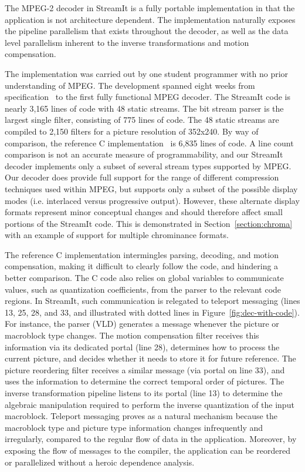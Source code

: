 The MPEG-2 decoder in StreamIt is a fully portable implementation in
that the application is not architecture dependent. The implementation
naturally exposes the pipeline parallelism that exists throughout the
decoder, as well as the data level parallelism inherent to the inverse
transformations and motion compensation.

The implementation was carried out by one student programmer with no
prior understanding of MPEG. The development spanned eight weeks from
specification~\cite{MPEG2} to the first fully functional MPEG
decoder. The StreamIt code is nearly 3,165 lines of code with 48
static streams. The bit stream parser is the largest single filter,
consisting of 775 lines of code. The 48 static streams are compiled to
2,150 filters for a picture resolution of 352x240. By way of
comparison, the reference C implementation~\cite{reference-mpeg-c} is
6,835 lines of code. A line count comparison is not an accurate
measure of programmability, and our StreamIt decoder 
implements only a subset of several stream types supported by MPEG.
Our decoder does provide full support for the range of different 
compression techniques used within MPEG, but supports only a subset 
of the possible display modes (i.e. interlaced versus progressive output).
However, these alternate display formats represent minor conceptual
changes and should therefore affect small portions of the StreamIt code. 
This is demonstrated in Section~\ref{section:chroma} with an example of
support for multiple chrominance formats. 

The reference C implementation intermingles parsing, decoding, and
motion compensation, making it difficult to clearly follow the code,
and hindering a better comparison. The C code also relies on global
variables to communicate values, such as quantization coefficients,
from the parser to the relevant code regions. In StreamIt, such
communication is relegated to teleport messaging (lines 13, 25, 28, and
33, and illustrated with dotted lines in
Figure~\ref{fig:dec-with-code}). For instance, the parser (VLD)
generates a message whenever the picture or macroblock type
changes. The motion compensation filter receives this information via
its dedicated portal (line 28), determines how to process the current
picture, and decides whether it needs to store it for future
reference. The picture reordering filter receives a similar message
(via portal on line 33), and uses the information to determine the
correct temporal order of pictures. The inverse transformation
pipeline listens to its portal (line 13) to determine the algebraic
manipulation required to perform the inverse quantization of the input
macroblock. Teleport messaging proves as a natural mechanism because
the macroblock type and picture type information changes infrequently
and irregularly, compared to the regular flow of data in the
application. Moreover, by exposing the flow of messages to the
compiler, the application can be reordered or parallelized without a
heroic dependence analysis.

